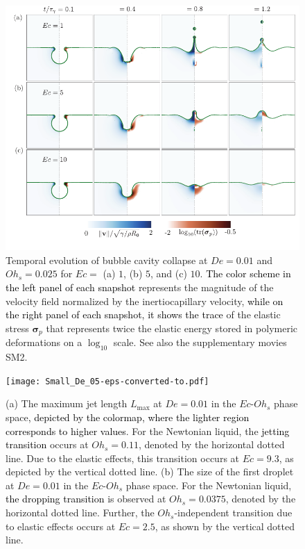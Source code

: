 \documentclass{jfm}
\newcommand{\VS}[1]{{\textcolor{black}{#1}}}
\newcommand{\AO}[1]{{\textcolor{black}{#1}}}
\newcommand{\AKD}[1]{{\textcolor{black}{#1}}}
\begin{document}
\begin{figure}
	\centering
	\includegraphics[width=\textwidth]{Facets_time_Oh_LowDe_08-eps-converted-to.pdf}
	\caption{Temporal evolution of bubble cavity collapse at $De = 0.01$ and $Oh_s = 0.025$ for $Ec =$ (a) $1$, (b) $5$, and (c) $10$. \AO{The color scheme in the left panel of each snapshot} represents the magnitude of the velocity field normalized by the inertiocapillary velocity, \AO{while on the right panel of each snapshot, it shows the trace} of the elastic stress $\boldsymbol{\sigma}_p$ that represents twice the elastic energy stored in polymeric deformations on a $\log_{10}$ scale. See also the supplementary movies SM2.}
	\label{factes-LowDe}
\end{figure}

\begin{figure}
	\centering
	\texttt{[image: Small\_De\_05-eps-converted-to.pdf]}
	\caption{(a) The maximum jet length $L_{\text{max}}$ at $De = 0.01$ in the $Ec$-$Oh_s$ phase space\AKD{, depicted by the colormap, where the lighter region corresponds to higher values}. For the Newtonian liquid, the \VS{jetting transition} occurs at $Oh_s = 0.11$, denoted by the horizontal dotted line. Due to the elastic effects, this transition occurs at $Ec = 9.3$, as depicted by the vertical dotted line. (b) The size of the first droplet at $De = 0.01$ in the $Ec$-$Oh_s$ phase space. For the Newtonian liquid, \VS{the dropping transition} is observed at $Oh_s = 0.0375$, denoted by the horizontal dotted line. Further, the $Oh_s$-independent transition due to elastic effects occurs at $Ec= 2.5$, as shown by the vertical dotted line.}
	\label{smallDe}
\end{figure}
\end{document}
